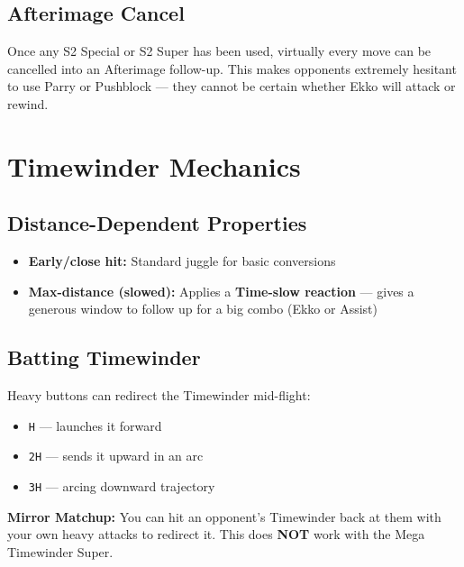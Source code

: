 \documentclass[12pt, a4paper]{report}
\newcommand{\notation}[1]{{\small\texttt{\textcolor{ekkoBlue}{#1}}}}
\newcommand{\imagePlaceholder}[1]{%
  \fbox{\begin{minipage}{0.95\textwidth}%
    \centering%
    \textcolor{ekkoGray}{\small[Image: #1]}%
  \end{minipage}}%
}
\begin{document}
\subsection{Afterimage Cancel}

Once any S2 Special or S2 Super has been used, virtually every move can be cancelled into an Afterimage follow-up. This makes opponents extremely hesitant to use Parry or Pushblock --- they cannot be certain whether Ekko will attack or rewind.

\section{Timewinder Mechanics}

\subsection{Distance-Dependent Properties}

\begin{itemize}
  \item \textbf{Early/close hit:} Standard juggle for basic conversions
  \item \textbf{Max-distance (slowed):} Applies a \textbf{Time-slow reaction} --- gives a generous window to follow up for a big combo (Ekko or Assist)
\end{itemize}

\begin{center}
\imagePlaceholder{ekko-timewinder-mechanics - Timewinder distance-dependent properties}
\end{center}

\subsection{Batting Timewinder}

Heavy buttons can redirect the Timewinder mid-flight:
\begin{itemize}
  \item \notation{H} --- launches it forward
  \item \notation{2H} --- sends it upward in an arc
  \item \notation{3H} --- arcing downward trajectory
\end{itemize}

\begin{tipbox}
\textbf{Mirror Matchup:} You can hit an opponent's Timewinder back at them with your own heavy attacks to redirect it. This does \textbf{NOT} work with the Mega Timewinder Super.
\end{tipbox}
\end{document}
